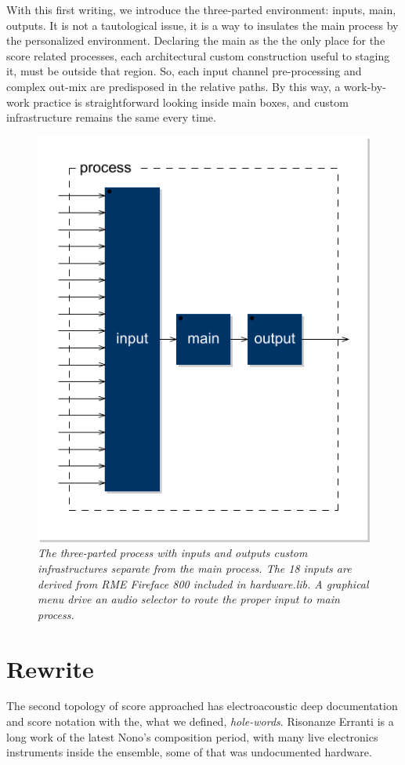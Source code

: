 \documentclass[twoside,a4paper]{article}
\begin{document}
With this first writing, we introduce the three-parted environment: inputs, main, outputs. It is not a tautological issue, it is a way to insulates the main process by the personalized environment. Declaring the main as the the only place for the score related processes, each architectural custom construction useful to staging it, must be outside that region. So, each input channel pre-processing and complex out-mix are predisposed in the relative paths. By this way, a work-by-work practice is straightforward looking inside main boxes, and custom infrastructure remains the same every time. 

\begin{figure}[ht]
\centerline{\includegraphics[width=.45\textwidth]{img/lais-process}}
\caption{\label{re-dia-6c}{\it The three-parted process with inputs and outputs custom infrastructures separate from the main process. The 18 inputs are derived from \emph{RME Fireface 800} included in \emph{hardware.lib}. A graphical menu drive an audio selector to route the proper input to main process.}}
\end{figure}


\section{Rewrite}
\label{sec:rewriting}

The second topology of score approached has electroacoustic deep documentation and score notation with the, what we defined, \emph{hole-words}. Risonanze Erranti is a long work of the latest Nono's composition period, with many live electronics instruments inside the ensemble, some of that was undocumented hardware. 
\end{document}
